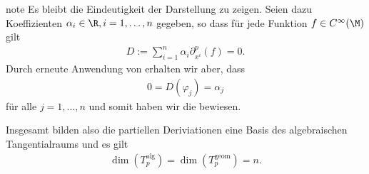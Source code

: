 \documentclass[letterpaper,10pt,english]{jupyterBook}
\begin{document}
\begin{sphinxadmonition}{note}
\sphinxAtStartPar
Es bleibt die Eindeutigkeit der Darstellung zu zeigen.
Seien dazu Koeffizienten \(\alpha_i \in \R, i=1,\ldots,n\) gegeben, so dass für jede Funktion \(f\in C^\infty(\M)\) gilt
\begin{equation*}
\begin{split}D:= \sum_{i=1}^n \alpha_i \partial_{x^i}^p(f) = 0.\end{split}
\end{equation*}
\sphinxAtStartPar
Durch erneute Anwendung von {\hyperref[\detokenize{manifolds/tangential:lem:partderkron}]{}} erhalten wir aber, dass
\begin{equation*}
\begin{split}0 = D(\varphi_j) = \alpha_j \end{split}
\end{equation*}
\sphinxAtStartPar
für alle \(j=1,\ldots,n\) und somit haben wir die  bewiesen.

\sphinxAtStartPar
Insgesamt bilden also die partiellen Deriviationen eine Basis des algebraischen Tangentialraums und es gilt
\begin{equation*}
\begin{split}\dim(T^{\text{alg}}_p)=\dim(T^{\text{geom}}_p)=n.\end{split}
\end{equation*}\end{sphinxadmonition}
\end{document}
